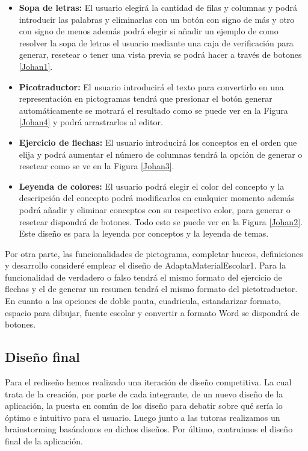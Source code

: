 \begin{itemize}
    \item \textbf{Sopa de letras:} El usuario elegirá la cantidad de filas y columnas y podrá introducir las palabras y eliminarlas con un botón con signo de más y otro con signo de menos además podrá elegir si añadir un ejemplo de como resolver la sopa de letras el usuario mediante una caja de verificación para generar, resetear o tener una vista previa se podrá hacer a través de botones \ref{Johan1}. 
    \item \textbf{Picotraductor:} El usuario introducirá el texto para convertirlo en una representación en pictogramas tendrá que presionar el botón generar automáticamente se motrará el resultado como se puede ver en la Figura \ref{Johan4} y podrá arrastrarlos al editor.
    \item \textbf{Ejercicio de flechas:} El usuario introducirá los conceptos en el orden que elija y podrá aumentar el número de columnas tendrá la opción de generar o resetear como se ve en la Figura \ref{Johan3}.
    \item  \textbf{Leyenda de colores:} El usuario podrá elegir el color del concepto y la descripción del concepto podrá modificarlos en cualquier momento además podrá añadir y eliminar conceptos con su respectivo color, para generar o resetear dispondrá de botones. Todo esto se puede ver en la Figura \ref{Johan2}. Este diseño es para la leyenda por conceptos y la leyenda de temas.
\end{itemize}
Por otra parte, las funcionalidades de pictograma, completar huecos, definiciones y desarrollo consideré emplear el diseño de AdaptaMaterialEscolar1. Para la funcionalidad de verdadero o falso tendrá el mismo formato del ejercicio de flechas y el de generar un resumen tendrá el mismo formato del pictotraductor. En cuanto a las opciones de doble pauta, cuadricula, estandarizar formato, espacio para dibujar, fuente escolar y convertir a formato Word se dispondrá de botones.


\subsection{Diseño final}
Para el rediseño hemos realizado una iteración de diseño competitiva. La cual trata de la creación, por parte de cada integrante, de un nuevo diseño de la aplicación, la puesta en común de los diseño para debatir sobre qué sería lo óptimo e intuitivo para el usuario. Luego junto a las tutoras realizamos un brainstorming basándonos en dichos diseños. Por último, contruimos el diseño final de la aplicación.


